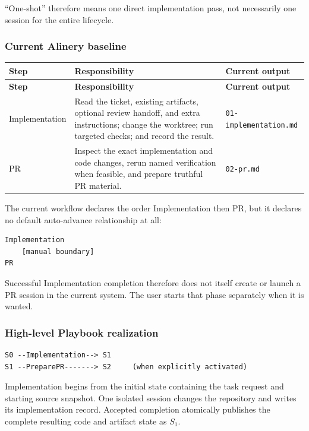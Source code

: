 \documentclass[11pt]{article}
\newcommand{\artifact}[1]{\texttt{#1}}
\begin{document}
``One-shot'' therefore means one direct implementation pass, not necessarily one session for the entire lifecycle.

\subsubsection{Current Alinery baseline}

\begin{longtable}{@{}L{1.20in}L{2.80in}L{1.90in}@{}}
\toprule
\textbf{Step} & \textbf{Responsibility} & \textbf{Current output} \\
\midrule
\endfirsthead
\toprule
\textbf{Step} & \textbf{Responsibility} & \textbf{Current output} \\
\midrule
\endhead
Implementation & Read the ticket, existing artifacts, optional review handoff, and extra instructions; change the worktree; run targeted checks; and record the result. & \artifact{01-implementation.md} \\
PR & Inspect the exact implementation and code changes, rerun named verification when feasible, and prepare truthful PR material. & \artifact{02-pr.md} \\
\bottomrule
\end{longtable}

The current workflow declares the order Implementation then PR, but it declares no default auto-advance relationship at all:

\begin{lstlisting}[style=playbook]
Implementation
    [manual boundary]
PR
\end{lstlisting}

Successful Implementation completion therefore does not itself create or launch a PR session in the current system. The user starts that phase separately when it is wanted.

\subsubsection{High-level Playbook realization}

\begin{lstlisting}[style=playbook]
S0 --Implementation--> S1
S1 --PreparePR-------> S2     (when explicitly activated)
\end{lstlisting}

Implementation begins from the initial state containing the task request and starting source snapshot. One isolated session changes the repository and writes its implementation record. Accepted completion atomically publishes the complete resulting code and artifact state as \(S_1\).
\end{document}
